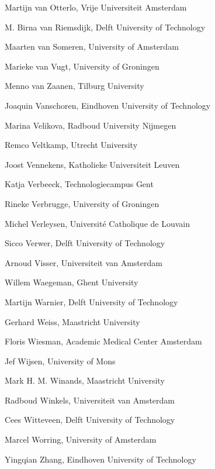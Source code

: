 \documentclass[a4paper,oneside]{book}
\makeatletter
\newcommand\MakePlainPagestyleEmpty{\let\ps@plain\ps@empty}
\makeatother
\begin{document}
\begin{compactitem}[]
		\item[] Martijn van Otterlo, Vrije Universiteit Amsterdam
		\item[] M. Birna van Riemsdijk, Delft University of Technology
		\item[] Maarten van Someren, University of Amsterdam
		\item[] Marieke van Vugt, University of Groningen
		\item[] Menno van Zaanen, Tilburg University
		\item[] Joaquin Vanschoren, Eindhoven University of Technology
		\item[] Marina Velikova, Radboud University Nijmegen
		\item[] Remco Veltkamp, Utrecht University
		\item[] Joost Vennekens, Katholieke Universiteit Leuven
		\item[] Katja Verbeeck, Technologiecampus Gent
		\item[] Rineke Verbrugge, University of Groningen
		\item[] Michel Verleysen, Universit\'e Catholique de Louvain
		\item[] Sicco Verwer, Delft University of Technology
		\item[] Arnoud Visser, Universiteit van Amsterdam
		\item[] Willem Waegeman, Ghent University
		\item[] Martijn Warnier, Delft University of Technology
		\item[] Gerhard Weiss, Maastricht University
		\item[] Floris Wiesman, Academic Medical Center Amsterdam
		\item[] Jef Wijsen, University of Mons
		\item[] Mark H. M. Winands, Maastricht University
		\item[] Radboud Winkels, Universiteit van Amsterdam
		\item[] Cees Witteveen, Delft University of Technology
		\item[] Marcel Worring, University of Amsterdam
		\item[] Yingqian Zhang, Eindhoven University of Technology
	\end{compactitem}



\newpage
{}
\tableofcontents

\mainmatter
\MakePlainPagestyleEmpty



\printindex[authors]


\end{document}
